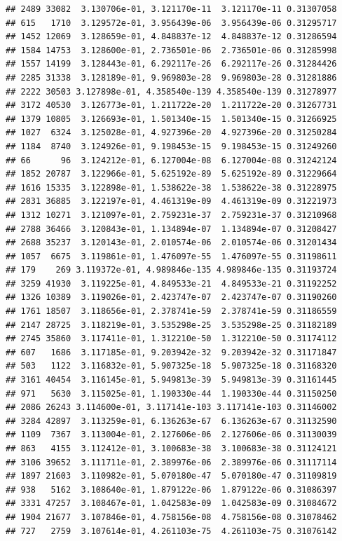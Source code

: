 \documentclass[
]{article}
\begin{document}
\begin{verbatim}
## 2489 33082  3.130706e-01, 3.121170e-11  3.121170e-11 0.31307058
## 615   1710  3.129572e-01, 3.956439e-06  3.956439e-06 0.31295717
## 1452 12069  3.128659e-01, 4.848837e-12  4.848837e-12 0.31286594
## 1584 14753  3.128600e-01, 2.736501e-06  2.736501e-06 0.31285998
## 1557 14199  3.128443e-01, 6.292117e-26  6.292117e-26 0.31284426
## 2285 31338  3.128189e-01, 9.969803e-28  9.969803e-28 0.31281886
## 2222 30503 3.127898e-01, 4.358540e-139 4.358540e-139 0.31278977
## 3172 40530  3.126773e-01, 1.211722e-20  1.211722e-20 0.31267731
## 1379 10805  3.126693e-01, 1.501340e-15  1.501340e-15 0.31266925
## 1027  6324  3.125028e-01, 4.927396e-20  4.927396e-20 0.31250284
## 1184  8740  3.124926e-01, 9.198453e-15  9.198453e-15 0.31249260
## 66      96  3.124212e-01, 6.127004e-08  6.127004e-08 0.31242124
## 1852 20787  3.122966e-01, 5.625192e-89  5.625192e-89 0.31229664
## 1616 15335  3.122898e-01, 1.538622e-38  1.538622e-38 0.31228975
## 2831 36885  3.122197e-01, 4.461319e-09  4.461319e-09 0.31221973
## 1312 10271  3.121097e-01, 2.759231e-37  2.759231e-37 0.31210968
## 2788 36466  3.120843e-01, 1.134894e-07  1.134894e-07 0.31208427
## 2688 35237  3.120143e-01, 2.010574e-06  2.010574e-06 0.31201434
## 1057  6675  3.119861e-01, 1.476097e-55  1.476097e-55 0.31198611
## 179    269 3.119372e-01, 4.989846e-135 4.989846e-135 0.31193724
## 3259 41930  3.119225e-01, 4.849533e-21  4.849533e-21 0.31192252
## 1326 10389  3.119026e-01, 2.423747e-07  2.423747e-07 0.31190260
## 1761 18507  3.118656e-01, 2.378741e-59  2.378741e-59 0.31186559
## 2147 28725  3.118219e-01, 3.535298e-25  3.535298e-25 0.31182189
## 2745 35860  3.117411e-01, 1.312210e-50  1.312210e-50 0.31174112
## 607   1686  3.117185e-01, 9.203942e-32  9.203942e-32 0.31171847
## 503   1122  3.116832e-01, 5.907325e-18  5.907325e-18 0.31168320
## 3161 40454  3.116145e-01, 5.949813e-39  5.949813e-39 0.31161445
## 971   5630  3.115025e-01, 1.190330e-44  1.190330e-44 0.31150250
## 2086 26243 3.114600e-01, 3.117141e-103 3.117141e-103 0.31146002
## 3284 42897  3.113259e-01, 6.136263e-67  6.136263e-67 0.31132590
## 1109  7367  3.113004e-01, 2.127606e-06  2.127606e-06 0.31130039
## 863   4155  3.112412e-01, 3.100683e-38  3.100683e-38 0.31124121
## 3106 39652  3.111711e-01, 2.389976e-06  2.389976e-06 0.31117114
## 1897 21603  3.110982e-01, 5.070180e-47  5.070180e-47 0.31109819
## 938   5162  3.108640e-01, 1.879122e-06  1.879122e-06 0.31086397
## 3331 47257  3.108467e-01, 1.042583e-09  1.042583e-09 0.31084672
## 1904 21677  3.107846e-01, 4.758156e-08  4.758156e-08 0.31078462
## 727   2759  3.107614e-01, 4.261103e-75  4.261103e-75 0.31076142

\end{verbatim}
\end{document}
